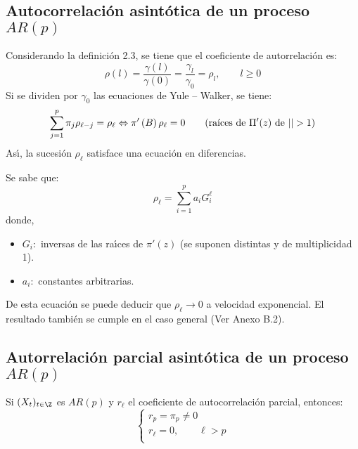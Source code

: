 \subsection{Autocorrelaci\'{o}n asint\'{o}tica de un proceso $AR(p)$}

Considerando la definici\'{o}n 2.3, se tiene que el coeficiente de 
autorrelaci\'{o}n es:
\[
\rho \left( l \right)=\frac{\gamma (l)}{\gamma 
(0)}=\frac{\gamma_{l}}{\gamma_{0}}=\rho 
_{l}, \qquad  l\ge 0
\]
Si se dividen por $\gamma_{0} $ las ecuaciones de Yule -- Walker, se tiene:
\[
 \sum_{j=1}^p {\pi_{j} \rho_{\ell -j} =\rho_{\ell } \Leftrightarrow 
\pi'\left( B \right)\rho_{\ell } =0} \qquad \text{(ra\'{\i}ces de $\Pi 
'(z)$ de $| |>1$)}
\]
As\'{\i}, la sucesi\'{o}n $\rho_{\ell } $ satisface una ecuaci\'{o}n en 
diferencias. 

Se sabe que:
\[
\rho_{\ell } =\sum_{i=1}^p {a_{i} G_{i}^{\ell } } 
\]
donde, 
\begin{itemize}
 \item $G_{i} :$ inversas de las ra\'{\i}ces de $\pi'\left( z \right)$ (se suponen distintas y de multiplicidad 1).
 \item $a_{i} :$ constantes arbitrarias.
\end{itemize}

De esta ecuaci\'{o}n se puede deducir que $\rho_{\ell } \to 0$ a velocidad 
exponencial. El resultado tambi\'{e}n se cumple en el caso general (Ver 
Anexo B.2).



\subsection{Autorrelaci\'{o}n parcial asint\'{o}tica de un proceso $AR (p)$}

\begin{teorema}
 Si $(X_{t} )_{t\in \Z} $ es $AR (p)$ y $r_{\ell } $ 
el coeficiente de autocorrelaci\'{o}n parcial, entonces:
\[
\left\{ {\begin{array}{l}
 r_{p} =\pi_{p} \ne 0 \\ 
 r_{\ell } =0,\qquad \ell >p \\ 
 \end{array}} \right.
\]
\end{teorema}


